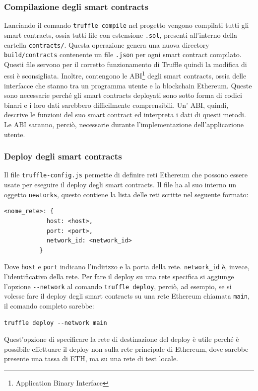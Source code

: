 \documentclass[a4paper]{article}
\begin{document}
        \subsubsection{Compilazione degli smart contracts}
        Lanciando il comando \verb|truffle compile| nel progetto vengono compilati tutti gli smart contracts, ossia tutti file con estensione \verb|.sol|, presenti all'interno della cartella \verb|contracts/|.
        Questa operazione genera una nuova directory \verb|build/contracts| contenente un file \verb|.json| per ogni smart contract compilato. Questi file servono per il corretto funzionamento di Truffle quindi la modifica di essi è sconsigliata.
        Inoltre, contengono le ABI\footnote{Application Binary Interface} degli smart contracts, ossia delle interfacce che stanno tra un programma utente e la blockchain Ethereum. Queste sono necessarie perché gli smart contracts deployati sono sotto forma
        di codici binari e i loro dati sarebbero difficilmente comprensibili. Un' ABI, quindi, descrive le funzioni del suo smart contract ed interpreta i dati di questi metodi. Le  ABI saranno, perciò, necessarie durante l'implementazione dell'applicazione utente.
        \subsubsection{Deploy degli smart contracts}
        Il file \verb|truffle-config.js| permette di definire reti Ethereum che possono essere usate per eseguire il deploy degli smart contracts. Il file ha al suo interno un oggetto \verb|newtorks|, questo contiene la lista delle reti scritte nel seguente formato:
        \begin{lstlisting}[style=ES6, title={Esempio di definizione di una rete Ethereum}]
          <nome_rete>: {
            host: <host>,
            port: <port>,
            network_id: <network_id>
          }\end{lstlisting}
        Dove \verb|host| e \verb|port| indicano l'indirizzo e la porta della rete. \verb|network_id| è, invece, l'identificativo della rete.
        \newline
        Per fare il deploy su una rete specifica si aggiunge l'opzione \verb|--network| al comando \verb|truffle deploy|, perciò, ad esempio,
        se si volesse fare il deploy degli smart contracts su una rete Ethereum chiamata \verb|main|, il comando completo sarebbe:
        \begin{lstlisting}[style=ES6, title={Esempio di deploy specificando la rete}]
          truffle deploy --network main\end{lstlisting}
        Quest'opzione di specificare la rete di destinazione del deploy è utile perché è possibile effettuare il deploy non sulla rete principale di Ethereum, dove sarebbe presente una tassa di ETH, ma su una rete di test locale. 
\end{document}
